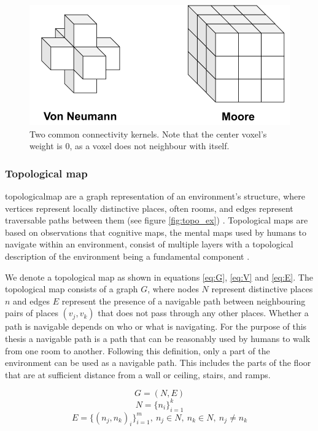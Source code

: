 \begin{figure}[h]
    \centering
    \includegraphics*[width=.7\textwidth]{./fig/voxel_neighbourhood.pdf}
    \caption{Two common connectivity kernels. Note that the center voxel's weight is 0, as a voxel does not neighbour with itself.}
    \label{fig:vg_nbs}
\end{figure}

\newpage


\subsubsection{Topological map}
\Gls{topologicalmap} are a graph representation of an environment's structure, where vertices represent locally distinctive places, often rooms, and edges represent traversable paths between them  (see figure \ref{fig:topo_ex}) \citep{thrun_learning_1998,kuipers_robust_1988}. Topological maps are based on observations that cognitive maps, the mental maps used by humans to navigate within an environment, consist of multiple layers with a topological description of the environment being a fundamental component \citep{kuipers_robust_1988,kuipers_modeling_1978}. 

We denote a topological map as shown in equations \ref{eq:G}, \ref{eq:V} and \ref{eq:E}. The topological map consists of a graph \(G\), where nodes \(N\) represent distinctive places \(n\) and edges \(E\) represent the presence of a navigable path between neighbouring pairs of places \((v_j,v_k)\) that does not pass through any other places. Whether a path is navigable depends on who or what is navigating. For the purpose of this thesis a navigable path is a path that can be reasonably used by humans to walk from one room to another. Following this definition, only a part of the environment can be used as a navigable path. This includes the parts of the floor that are at sufficient distance from a wall or ceiling, stairs, and ramps.


\begin{equation}
    \label{eq:G}
    G=(N, E)
\end{equation}
\begin{equation}
    \label{eq:V}
    N=\{n_i\}_{i=1}^k
\end{equation}
\begin{equation}
    \label{eq:E}
    E=\{(n_j,n_k)_i\}_{i=1}^m,\ n_j \in N,\ n_k \in N,\ n_j \neq n_k
\end{equation}

